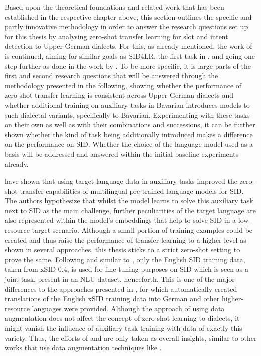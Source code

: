 \documentclass[11pt,a4paper,twoside,openright]{scrbook}
\begin{document}
Based upon the theoretical foundations and related work that has been established in the respective chapter above, this section outlines the specific and partly innovative methodology in order to answer the research questions set up for this thesis by analysing zero-shot transfer learning for slot and intent detection to Upper German dialects. For this, as already mentioned, the work of \citet{van-der-goot-etal-2021-masked} is continued, aiming for similar goals as SID4LR, the first task in \citet{2023-findings-vardial}, and going one step further as done in the work by \citet{winkler-etal-2024-slot-intent}. To be more specific, it is large parts of the first and second research questions that will be answered through the methodology presented in the following, showing whether the performance of zero-shot transfer learning is consistent across Upper German dialects and whether additional training on auxiliary tasks in Bavarian introduces models to such dialectal variants, specifically to Bavarian. Experimenting with these tasks on their own as well as with their combinations and successions, it can be further shown whether the kind of task being additionally introduced makes a difference on the performance on SID. Whether the choice of the language model used as a basis will be addressed and answered within the initial baseline experiments already.

\citet{van-der-goot-etal-2021-masked} have shown that using target-language data in auxiliary tasks improved the zero-shot transfer capabilities of multilingual pre-trained language models for SID. The authors hypothesize that whilst the model learns to solve this auxiliary task next to SID as the main challenge, further peculiarities of the target language are also represented within the model's embeddings that help to solve SID in a low-resource target scenario. Although a small portion of training examples could be created and thus raise the performance of transfer learning to a higher level as shown in several approaches, this thesis sticks to a strict zero-shot setting to prove the same. Following \citet{van-der-goot-etal-2021-masked} and similar to \citet{schuster-etal-2019-cross-lingual}, only the English SID training data, taken from xSID-0.4, is used for fine-tuning purposes on SID which is seen as a joint task, present in an NLU dataset, henceforth. This is one of the major differences to the approaches presented in \citep{2023-findings-vardial}, for which automatically created translations of the English xSID training data into German and other higher-resource languages were provided. Although the approach of using data augmentation does not affect the concept of zero-shot learning to dialects, it might vanish the influence of auxiliary task training with data of exactly this variety. Thus, the efforts of \citet{kwon-etal-2023-sidlr} and \citet{srivastava-chiang-2023-fine} are only taken as overall insights, similar to other works that use data augmentation techniques like \citet{jhan-etal-2022-c5l7}.
\end{document}
